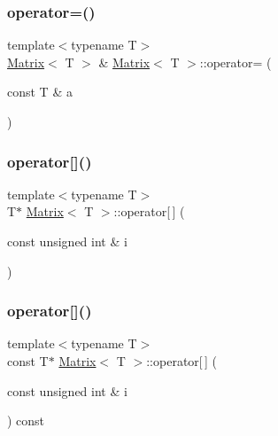 \mbox{\label{classMatrix_a603960a94121d9b35509199de88d1a92}} 
\subsubsection{\texorpdfstring{operator=()}{operator=()}\hspace{0.1cm}{\footnotesize\ttfamily [2/2]}}
{\footnotesize\ttfamily template$<$typename T$>$ \\
\mbox{\hyperlink{classMatrix}{Matrix}}$<$ T $>$ \& \mbox{\hyperlink{classMatrix}{Matrix}}$<$ T $>$\+::operator= (\begin{DoxyParamCaption}\item[{const T \&}]{a }\end{DoxyParamCaption})\hspace{0.3cm}{\ttfamily [inline]}}

\mbox{\label{classMatrix_a771eff354da6c0008228dc19cde4142a}} 
\subsubsection{\texorpdfstring{operator[]()}{operator[]()}\hspace{0.1cm}{\footnotesize\ttfamily [1/2]}}
{\footnotesize\ttfamily template$<$typename T$>$ \\
T$\ast$ \mbox{\hyperlink{classMatrix}{Matrix}}$<$ T $>$\+::operator\mbox{[}$\,$\mbox{]} (\begin{DoxyParamCaption}\item[{const unsigned int \&}]{i }\end{DoxyParamCaption})\hspace{0.3cm}{\ttfamily [inline]}}

\mbox{\label{classMatrix_af58cf6372d17f7abf5396d32f3ef5cd7}} 
\subsubsection{\texorpdfstring{operator[]()}{operator[]()}\hspace{0.1cm}{\footnotesize\ttfamily [2/2]}}
{\footnotesize\ttfamily template$<$typename T$>$ \\
const T$\ast$ \mbox{\hyperlink{classMatrix}{Matrix}}$<$ T $>$\+::operator\mbox{[}$\,$\mbox{]} (\begin{DoxyParamCaption}\item[{const unsigned int \&}]{i }\end{DoxyParamCaption}) const\hspace{0.3cm}{\ttfamily [inline]}}

